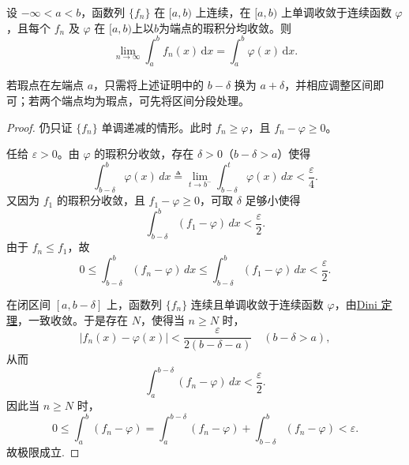 \documentclass[../../main.tex]{subfiles}%
\begin{document}
\begin{proposition}\label{proposition:单调收敛积分可交换-瑕积分情形}
设 $-\infty<a<b$，函数列 $\{f_n\}$ 在 $[a,b)$ 上连续，在 $[a,b)$ 上单调收敛于连续函数 $\varphi$，且每个 $f_n$ 及 $\varphi$ 在 $[a,b)$上以$b$为端点的瑕积分均收敛。则
\[
\lim_{n\to\infty}\int_a^b f_n(x)\,\mathrm{d}x
=
\int_a^b \varphi(x)\,\mathrm{d}x.
\]
\end{proposition}
\begin{remark}
若瑕点在左端点 $a$，只需将上述证明中的 $b-\delta$ 换为 $a+\delta$，并相应调整区间即可；若两个端点均为瑕点，可先将区间分段处理。
\end{remark}
\begin{proof}
仍只证 $\{f_n\}$ 单调递减的情形。此时 $f_n\geqslant \varphi$，且 $f_n-\varphi\geqslant 0$。

任给 $\varepsilon>0$。由 $\varphi$ 的瑕积分收敛，存在 $\delta>0$（$b-\delta>a$）使得
\[
\int_{b-\delta}^b \varphi(x)\,dx
\triangleq 
\lim_{t\to b^-}\int_{b-\delta}^t \varphi(x)\,dx
< \frac{\varepsilon}{4}.
\]
又因为 $f_1$ 的瑕积分收敛，且 $f_1-\varphi\geqslant 0$，可取 $\delta$ 足够小使得
\[
\int_{b-\delta}^b (f_1-\varphi)\,dx
< \frac{\varepsilon}{2}.
\]
由于 $f_n\leqslant f_1$，故
\[
0\leqslant \int_{b-\delta}^b (f_n-\varphi)\,dx
\leqslant \int_{b-\delta}^b (f_1-\varphi)\,dx
< \frac{\varepsilon}{2}.
\]

在闭区间 $[a,b-\delta]$ 上，函数列 $\{f_n\}$ 连续且单调收敛于连续函数 $\varphi$，由\hyperref[theorem:Dini定理(数分版本)]{Dini 定理}，一致收敛。于是存在 $N$，使得当 $n\geqslant N$ 时，
\[
|f_n(x)-\varphi(x)| < \frac{\varepsilon}{2(b-\delta-a)}
\quad (b-\delta>a),
\]
从而
\[
\int_a^{b-\delta} (f_n-\varphi)\,dx < \frac{\varepsilon}{2}.
\]
因此当 $n\geqslant N$ 时，
\[
0\leqslant \int_a^b (f_n-\varphi)
=
\int_a^{b-\delta}(f_n-\varphi)+\int_{b-\delta}^b(f_n-\varphi)
< \varepsilon.
\]
故极限成立.
\end{proof}
\end{document}
